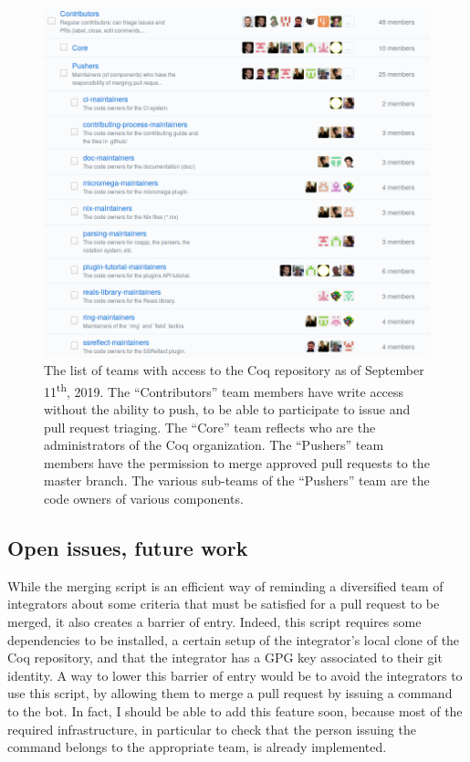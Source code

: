 
\begin{figure}
	\includegraphics[width=15cm]{maintainer-teams.png}
	\caption{
		The list of teams with access to the Coq repository as of September 11\textsuperscript{th}, 2019.
		The ``Contributors'' team members have write access without the ability to push, to be able to participate to issue and pull request triaging.
		The ``Core'' team reflects who are the administrators of the Coq organization.
		The ``Pushers'' team members have the permission to merge approved pull requests to the master branch.
		The various sub-teams of the ``Pushers'' team are the code owners of various components.
	}
	\label{fig:teams}
\end{figure}

\subsection{Open issues, future work}

\label{sec:open-issues-distributed-merging}

While the merging script is an efficient way of reminding a diversified team of integrators about some criteria that must be satisfied for a pull request to be merged, it also creates a barrier of entry.
Indeed, this script requires some dependencies to be installed, a certain setup of the integrator's local clone of the Coq repository, and that the integrator has a GPG key associated to their git identity.
A way to lower this barrier of entry would be to avoid the integrators to use this script, by allowing them to merge a pull request by issuing a command to the bot.
In fact, I should be able to add this feature soon, because most of the required infrastructure, in particular to check that the person issuing the command belongs to the appropriate team, is already implemented.

